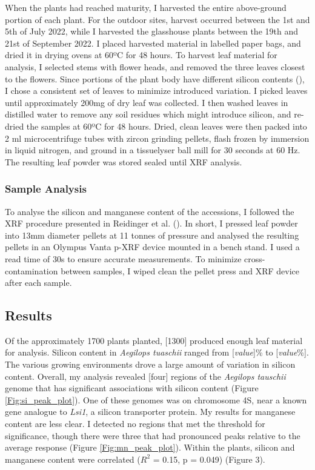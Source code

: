 \documentclass[12pt, letterpaper, ]{article}
\begin{document}
When the plants had reached maturity, I harvested the entire above-ground portion of each plant. For the outdoor sites, harvest occurred between the 1st and 5th of July 2022, while I harvested the glasshouse plants between the 19th and 21st of September 2022. I placed harvested material in labelled paper bags, and dried it in drying ovens at 60ºC for 48 hours. To harvest leaf material for analysis, I selected stems with flower heads, and removed the three leaves closest to the flowers. Since portions of the plant body have different silicon contents (\cite{dai_genetic_2005}), I chose a consistent set of leaves to minimize introduced variation. I picked leaves until approximately 200mg of dry leaf was collected. I then washed leaves in distilled water to remove any soil residues which might introduce silicon, and re-dried the samples at 60ºC for 48 hours. Dried, clean leaves were then packed into 2 ml microcentrifuge tubes with zircon grinding pellets, flash frozen by immersion in liquid nitrogen, and ground in a tissuelyser ball mill for 30 seconds at 60 Hz. The resulting leaf powder was stored sealed until XRF analysis. 

\subsubsection{Sample Analysis}

To analyse the silicon and manganese content of the accessions, I followed the XRF procedure presented in Reidinger et al. (). In short, I pressed leaf powder into 13mm diameter pellets at 11 tonnes of pressure and analysed the resulting pellets in an Olympus Vanta p-XRF device mounted in a bench stand. I used a read time of 30s to ensure accurate measurements. To minimize cross-contamination between samples, I wiped clean the pellet press and XRF device after each sample.

\subsection{Results}

Of the approximately 1700 plants planted, [1300] produced enough leaf material for analysis. Silicon content in \textit{Aegilops tuaschii} ranged from [\textit{value}]\% to [\textit{value}\%]. The various growing environments drove a large amount of variation in silicon content. Overall, my analysis revealed [four] regions of the \textit{Aegilops tauschii} genome that has significant associations with silicon content (Figure \ref{Fig:si_peak_plot}). One of these genomes was on chromosome 4S, near a known gene analogue to \textit{Lsi1}, a silicon transporter protein. My results for manganese content are less clear. I detected no regions that met the threshold for significance, though there were three that had pronounced peaks relative to the average response (Figure \ref{Fig:mn_peak_plot}). Within the plants, silicon and manganese content were correlated ($R^2$ = 0.15, p = 0.049) (Figure 3). 
\end{document}
